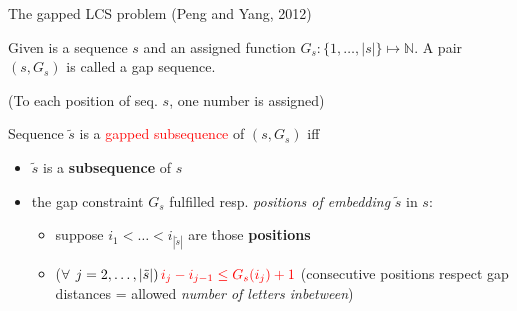 \documentclass{beamer}
\begin{document}
\begin{frame}{The gapped LCS problem (Peng and Yang, 2012)}
   \begin{definition}
       Given is a sequence $s$ and an assigned function 
       $G_s \colon \{1, \ldots, |s|\} \mapsto \mathbb{N}$. A pair $(s, G_s)$ is called a {gap sequence}.
   \end{definition} (To each position of seq. $s$, one number is assigned) \vspace{0.5cm}
   
   \begin{definition}
         Sequence $\tilde{s}$ is a \textcolor{red}{gapped subsequence} of $(s, G_s)$ iff 
         \begin{itemize}
             \item $\tilde{s}$ is a \textbf{subsequence} of $s$
             \item the gap constraint $G_s$ fulfilled resp. \textit{positions of embedding} $\tilde{s}$ in $s$:
         \begin{itemize}
             \item  suppose $i_1< \ldots <i_{|\tilde{s}|}$ are those \textbf{positions}  
             \item ($\forall$ $j=2, \ldots, |\tilde{s}|)\, \textcolor{red}{i_{j} - i_{j-1} \leq G_{s}(i_{j})+1}$  (consecutive positions respect gap distances = allowed \textit{number of letters inbetween})
         \end{itemize}
       \end{itemize}
   \end{definition}
   
\end{frame}
\end{document}
